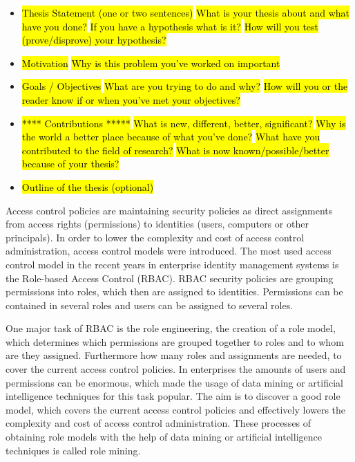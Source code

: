     \begin{itemize}
        \item \hl{Thesis Statement (one or two sentences)}
            \subitem \hl{What is your thesis about and what have you done?}
            \subitem \hl{If you have a hypothesis what is it?}
            \subitem \hl{How will you test (prove/disprove) your hypothesis?}
        \item \hl{Motivation}
            \subitem \hl{Why is this problem you've worked on important}
        \item \hl{Goals / Objectives}
            \subitem \hl{What are you trying to do and why?}
            \subitem \hl{How will you or the reader know if or when you've met your objectives?}
        \item \hl{**** Contributions *****}
            \subitem \hl{What is new, different, better, significant?}
            \subitem \hl{Why is the world a better place because of what you've done?}
            \subitem \hl{What have you contributed to the field of research?}
            \subitem \hl{What is now known/possible/better because of your thesis?}
        \item \hl{Outline of the thesis (optional)}
    \end{itemize}
\fi
Access control policies are maintaining security policies as direct assignments from access rights (permissions) to identities (users, computers or other principals). In order to lower the complexity and cost of access control administration, access control models were introduced. The most used access control model in the recent years in enterprise identity management systems is the Role-based Access Control (RBAC)\cite{Kunz}. RBAC security policies are grouping permissions into roles, which then are assigned to identities. Permissions can be contained in several roles and users can be assigned to several roles.

One major task of RBAC is the role engineering, the creation of a role model, which determines which permissions are grouped together to roles and to whom are they assigned. Furthermore how many roles and assignments are needed, to cover the current access control policies. In enterprises the amounts of users and permissions can be enormous, which made the usage of data mining or artificial intelligence techniques for this task popular. The aim is to discover a good role model, which covers the current access control policies and effectively lowers the complexity and cost of access control administration. These processes of obtaining role models with the help of data mining or artificial intelligence techniques is called role mining.

